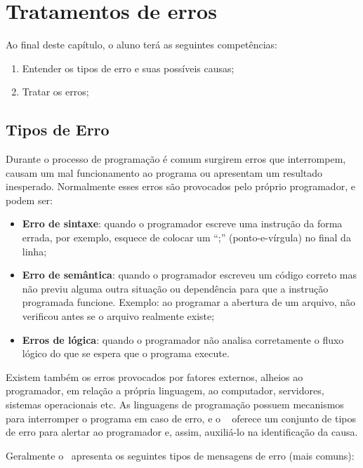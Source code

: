 \chapter{Tratamentos de erros}
\label{tratamentos-de-erros}

Ao final deste capítulo, o aluno terá as seguintes competências:
\begin{enumerate}
    \item Entender os tipos de erro e suas possíveis causas;
    \item Tratar os erros;
\end{enumerate}

\section{Tipos de Erro}
\label{tipos-de-erro}

Durante o processo de programação é comum surgirem erros que interrompem, causam 
um mal funcionamento ao programa ou apresentam um resultado inesperado. Normalmente 
esses erros são provocados pelo próprio programador, e podem ser:

\begin{itemize}
  \item \textbf{Erro de sintaxe}: quando o programador escreve uma instrução da forma 
  errada, por exemplo, esquece de colocar um ``;'' (ponto-e-vírgula) no final da linha;
  \item \textbf{Erro de semântica}: quando o programador escreveu um código correto mas 
  não previu alguma outra situação ou dependência para que a instrução programada funcione. 
  Exemplo: ao programar a abertura de um arquivo, não verificou antes se o arquivo realmente existe;
  \item \textbf{Erros de lógica}: quando o programador não analisa corretamente o fluxo 
  lógico do que se espera que o programa execute.
\end{itemize}

Existem também os erros provocados por fatores externos, alheios ao programador, em relação a 
própria linguagem, ao computador, servidores, sistemas operacionais etc. As linguagens de 
programação possuem mecanismos para interromper o programa em caso de erro, e o \php~
oferece um conjunto de tipos de erro para alertar ao programador e, assim, auxiliá-lo 
na identificação da causa.

Geralmente o \php~apresenta os seguintes tipos de mensagens de erro (mais comuns):

